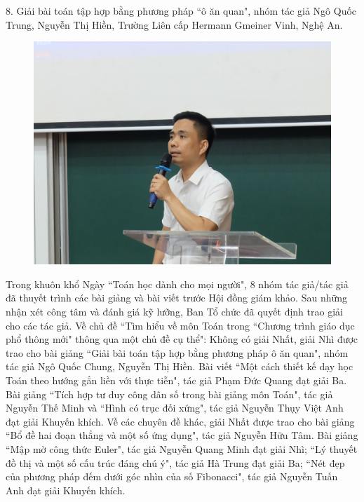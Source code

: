 \begin{multicols}{2}
\begin{figure}[H]
		\vspace*{-15pt}
	\end{figure}
	$8$. Giải bài toán tập hợp bằng phương pháp ``ô ăn quan", nhóm tác giả Ngô Quốc Trung, Nguyễn Thị Hiền, Trường Liên cấp Hermann Gmeiner Vinh, Nghệ An. 
	\begin{figure}[H]
		\vspace*{-5pt}
		\centering
		\captionsetup{labelformat= empty, justification=centering}
		\includegraphics[width= 1\linewidth]{9}
		\vspace*{-15pt}
	\end{figure}
	Trong khuôn khổ Ngày ``Toán học dành cho mọi người", $8$ nhóm tác giả/tác giả đã thuyết trình các bài giảng và bài viết trước Hội đồng giám khảo. Sau những nhận xét công tâm và đánh giá kỹ lưỡng, Ban Tổ chức đã quyết định trao giải cho các tác giả.
	\vskip 0.1cm
	Về chủ đề ``Tìm hiểu về môn Toán trong ``Chương trình giáo dục phổ thông mới" thông qua một chủ đề cụ thể": Không có giải Nhất, giải Nhì được trao cho bài giảng ``Giải bài toán tập hợp bằng phương pháp ô ăn quan", nhóm tác giả Ngô Quốc Chung, Nguyễn Thị Hiền. Bài viết ``Một cách thiết kế dạy học Toán theo hướng gắn liền với thực tiễn", tác giả Phạm Đức Quang đạt giải Ba. Bài giảng ``Tích hợp tư duy công dân số trong bài giảng môn Toán", tác giả Nguyễn Thế Minh và ``Hình có trục đối xứng", tác giả Nguyễn Thụy Việt Anh đạt giải Khuyến khích. 
	\vskip 0.1cm
	Về các chuyên đề khác, giải Nhất được trao cho bài giảng ``Bổ đề hai đoạn thẳng và một số ứng dụng", tác giả Nguyễn Hữu Tâm. Bài giảng ``Mập mờ công thức Euler", tác giả Nguyễn Quang Minh đạt giải Nhì; ``Lý thuyết đồ thị và một số cấu trúc đáng chú ý", tác giả Hà Trung đạt giải Ba; ``Nét đẹp của phương pháp đếm dưới góc nhìn của số Fibonacci", tác giả Nguyễn Tuấn Anh đạt giải Khuyến khích. 
	\end{multicols}

